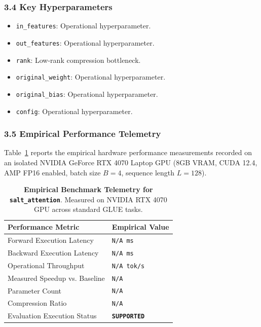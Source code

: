 \subsubsection*{3.4 Key Hyperparameters}
\begin{itemize}
    \item \texttt{in\_features}: Operational hyperparameter.
    \item \texttt{out\_features}: Operational hyperparameter.
    \item \texttt{rank}: Low-rank compression bottleneck.
    \item \texttt{original\_weight}: Operational hyperparameter.
    \item \texttt{original\_bias}: Operational hyperparameter.
    \item \texttt{config}: Operational hyperparameter.
\end{itemize}

\subsubsection*{3.5 Empirical Performance Telemetry}
Table~\ref{tab:telemetry_salt\_attention} reports the empirical hardware performance measurements recorded on an isolated NVIDIA GeForce RTX 4070 Laptop GPU (8GB VRAM, CUDA 12.4, AMP FP16 enabled, batch size $B=4$, sequence length $L=128$).

\begin{table}[h]
\centering
\small
\caption{\textbf{Empirical Benchmark Telemetry for \texttt{salt\_attention}}. Measured on NVIDIA RTX 4070 GPU across standard GLUE tasks.}
\label{tab:telemetry_salt\_attention}
\begin{tabularx}{\columnwidth}{lX}
\toprule
\textbf{Performance Metric} & \textbf{Empirical Value} \\
\midrule
Forward Execution Latency & \texttt{N/A ms} \\
Backward Execution Latency & \texttt{N/A ms} \\
Operational Throughput & \texttt{N/A tok/s} \\
Measured Speedup vs. Baseline & \texttt{N/A} \\
Parameter Count & \texttt{N/A} \\
Compression Ratio & \texttt{N/A} \\
Evaluation Execution Status & \textbf{\texttt{SUPPORTED}} \\
\bottomrule
\end{tabularx}
\end{table}

